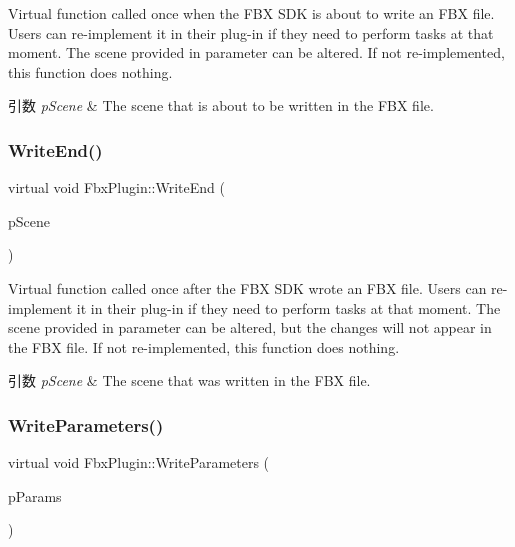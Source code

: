 Virtual function called once when the F\+BX S\+DK is about to write an F\+BX file. Users can re-\/implement it in their plug-\/in if they need to perform tasks at that moment. The scene provided in parameter can be altered. If not re-\/implemented, this function does nothing. 
\begin{DoxyParams}{引数}
{\em p\+Scene} & The scene that is about to be written in the F\+BX file. \\
\hline
\end{DoxyParams}
\mbox{\label{class_fbx_plugin_a7c61fbd0c3d3a3d41f7208c2b28ce379}} 
\subsubsection{\texorpdfstring{Write\+End()}{WriteEnd()}}
{\footnotesize\ttfamily virtual void Fbx\+Plugin\+::\+Write\+End (\begin{DoxyParamCaption}\item[{\hyperlink{class_fbx_scene}{Fbx\+Scene} \&}]{p\+Scene }\end{DoxyParamCaption})\hspace{0.3cm}{\ttfamily [virtual]}}

Virtual function called once after the F\+BX S\+DK wrote an F\+BX file. Users can re-\/implement it in their plug-\/in if they need to perform tasks at that moment. The scene provided in parameter can be altered, but the changes will not appear in the F\+BX file. If not re-\/implemented, this function does nothing. 
\begin{DoxyParams}{引数}
{\em p\+Scene} & The scene that was written in the F\+BX file. \\
\hline
\end{DoxyParams}
\mbox{\label{class_fbx_plugin_af4b6ae438302c2153d582f1d6c87b636}} 
\subsubsection{\texorpdfstring{Write\+Parameters()}{WriteParameters()}}
{\footnotesize\ttfamily virtual void Fbx\+Plugin\+::\+Write\+Parameters (\begin{DoxyParamCaption}\item[{\hyperlink{class_fbx_object}{Fbx\+Object} \&}]{p\+Params }\end{DoxyParamCaption})\hspace{0.3cm}{\ttfamily [virtual]}}

